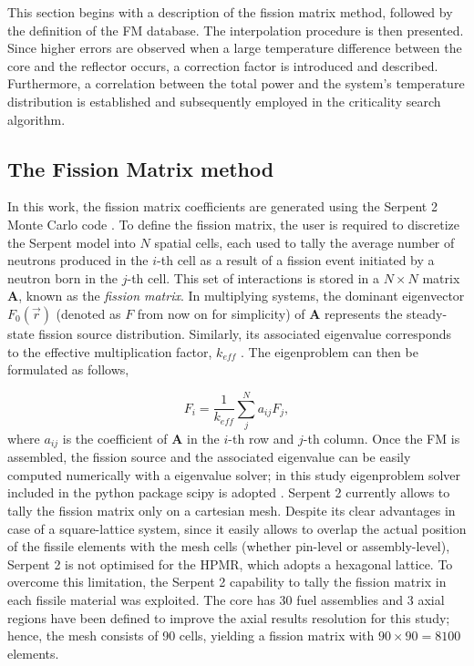 \documentclass[preprint,review,12pt]{elsarticle}
\begin{document}
This section begins with a description of the fission matrix method, followed by the definition of the FM database. The interpolation procedure is then presented.
Since higher errors are observed when a large temperature difference between the core and the reflector occurs, a correction factor is introduced and described. Furthermore, a correlation between the total power and the system’s temperature distribution is established and subsequently employed in the criticality search algorithm.

\subsection{The Fission Matrix method} \label{subsection:Fission matrix definition}
In this work, the fission matrix coefficients are generated using the Serpent 2 Monte Carlo code \cite{LEPPANEN2025}.
To define the fission matrix, the user is required to discretize the Serpent model into $N$ spatial cells, each used to tally the average number of neutrons produced in the $i$-th cell as a result of a fission event initiated by a neutron born in the $j$-th cell. This set of interactions is stored in a $N \times N$ matrix $\textbf{A}$, known as the \textit{fission matrix}. In multiplying systems, the dominant eigenvector $F_0(\vec{r})$ (denoted as $F$ from now on for simplicity) of $\textbf{A}$ represents the steady-state fission source distribution. Similarly, its associated eigenvalue corresponds to the effective multiplication factor, $k_{eff}$ \cite{Carney2014}. The eigenproblem can then be formulated as follows,

\begin{equation}
F_i = \frac{1}{k_{eff}}\sum_j^N a_{ij}F_j,
\end{equation}
where $a_{ij}$ is the coefficient of $\textbf{A}$ in the $i$-th row and $j$-th column. Once the FM is assembled, the fission source and the associated eigenvalue can be easily computed numerically with a eigenvalue solver; in this study eigenproblem solver included in the python  package scipy is adopted \cite{2020SciPy-NMeth}.
Serpent 2 currently allows to tally the fission matrix only on a cartesian mesh. Despite its clear advantages in case of a square-lattice system, since it easily allows to overlap the actual position of the fissile elements with the mesh cells (whether pin-level or assembly-level), Serpent 2 is not optimised for the HPMR, which adopts a hexagonal lattice. 
To overcome this limitation, the Serpent 2 capability to tally the fission matrix in each fissile material was exploited. The core has 30 fuel assemblies and 3 axial regions have been defined to improve the axial results resolution for this study; hence, the mesh consists of 90 cells, yielding a fission matrix with $90×90=8100$ elements.
\end{document}
